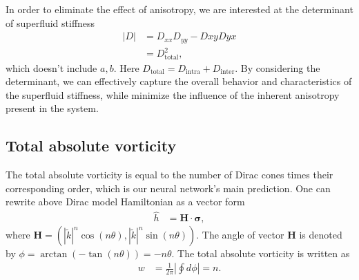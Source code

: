 \documentclass{article}
\begin{document}
In  order to eliminate the effect of anisotropy, we are interested at the determinant of superfluid stiffness 
\begin{align}
    \left\vert D \right\vert &= D_{xx}D_{yy} - D{xy}D{yx}\\
                             &= D_{\textrm{total}}^2, 
\end{align}
which doesn't include $ a,b $.  Here $ D_{\textrm{total}} = D_{\textrm{intra}} + D_{\textrm{inter}}    $. By considering the determinant, we can effectively capture the overall behavior and characteristics of the superfluid stiffness, while minimize the influence of the inherent anisotropy present in the system.

\subsection{Total absolute vorticity}
The total absolute vorticity is equal to the number of Dirac cones times their corresponding order, which is our neural network's main prediction. One can rewrite above Dirac model Hamiltonian as a vector form 
\begin{align}
    \hat{h} &= \mathbf{H} \cdot \bm{\sigma},
\end{align}
where $ \mathbf{H}= \left(\left\vert \widetilde{k}   \right\vert^n \cos(n \theta),\left\vert \widetilde{k}   \right\vert^n \sin(n \theta) \right) $. The angle of vector $ \mathbf{H} $ is denoted by $ \phi = \arctan(-\tan(n \theta)) = -n \theta $. The total absolute vorticity is written as 
\begin{align}
    w &= \frac{1}{2\pi}\left\vert \oint d \phi  \right\vert =  n. 
\end{align}
\end{document}
